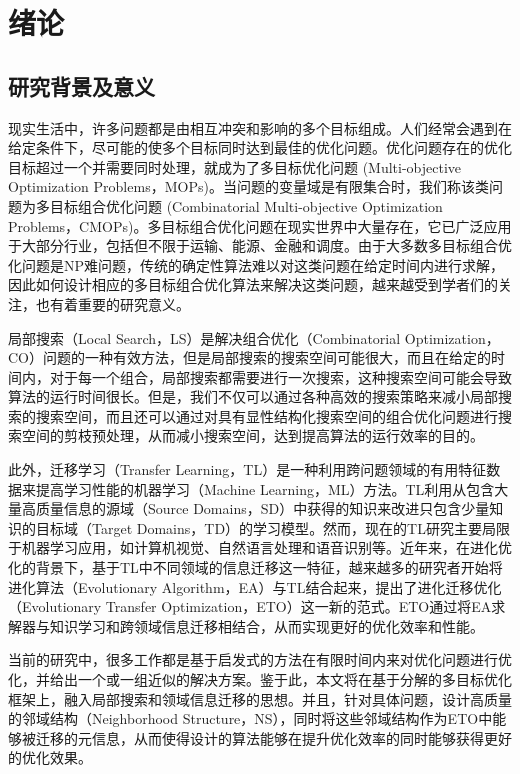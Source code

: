 \chapter{绪论}

\section{研究背景及意义}

现实生活中，许多问题都是由相互冲突和影响的多个目标组成。人们经常会遇到在给定条件下，尽可能的使多个目标同时达到最佳的优化问题。优化问题存在的优化目标超过一个并需要同时处理，就成为了多目标优化问题 (Multi-objective Optimization Problems，MOPs)。当问题的变量域是有限集合时，我们称该类问题为多目标组合优化问题 (Combinatorial Multi-objective Optimization Problems，CMOPs)。多目标组合优化问题在现实世界中大量存在，它已广泛应用于大部分行业，包括但不限于运输、能源、金融和调度。由于大多数多目标组合优化问题是NP难问题，传统的确定性算法难以对这类问题在给定时间内进行求解，因此如何设计相应的多目标组合优化算法来解决这类问题，越来越受到学者们的关注，也有着重要的研究意义。
\par
局部搜索（Local Search，LS）是解决组合优化（Combinatorial Optimization，CO）问题的一种有效方法，但是局部搜索的搜索空间可能很大，而且在给定的时间内，对于每一个组合，局部搜索都需要进行一次搜索，这种搜索空间可能会导致算法的运行时间很长。但是，我们不仅可以通过各种高效的搜索策略来减小局部搜索的搜索空间，而且还可以通过对具有显性结构化搜索空间的组合优化问题进行搜索空间的剪枝预处理，从而减小搜索空间，达到提高算法的运行效率的目的。
\par
此外，迁移学习（Transfer Learning，TL）是一种利用跨问题领域的有用特征数据来提高学习性能的机器学习（Machine Learning，ML）方法。TL利用从包含大量高质量信息的源域（Source Domains，SD）中获得的知识来改进只包含少量知识的目标域（Target Domains，TD）的学习模型\cite{pan2009survey}。然而，现在的TL研究主要局限于机器学习应用，如计算机视觉、自然语言处理和语音识别等。近年来，在进化优化的背景下，基于TL中不同领域的信息迁移这一特征，越来越多的研究者开始将进化算法（Evolutionary Algorithm，EA）与TL结合起来，提出了进化迁移优化（Evolutionary Transfer Optimization，ETO）这一新的范式。ETO通过将EA求解器与知识学习和跨领域信息迁移相结合，从而实现更好的优化效率和性能。
\par
当前的研究中，很多工作都是基于启发式的方法在有限时间内来对优化问题进行优化，并给出一个或一组近似的解决方案。鉴于此，本文将在基于分解的多目标优化框架上，融入局部搜索和领域信息迁移的思想。并且，针对具体问题，设计高质量的邻域结构（Neighborhood Structure，NS），同时将这些邻域结构作为ETO中能够被迁移的元信息，从而使得设计的算法能够在提升优化效率的同时能够获得更好的优化效果。

